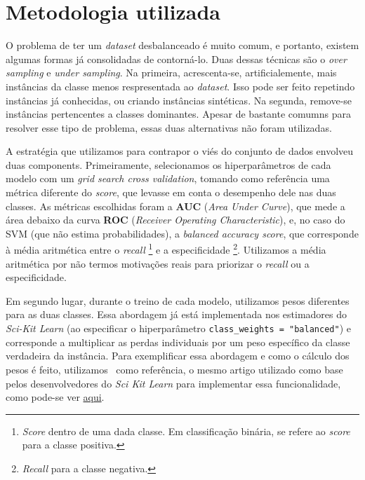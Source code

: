 \section{Metodologia utilizada}

O problema de ter um \emph{dataset} desbalanceado é muito comum, e portanto, existem algumas formas já consolidadas de contorná-lo.
Duas dessas técnicas são o \emph{over sampling} e \emph{under sampling}.
Na primeira, acrescenta-se, artificialemente, mais instâncias da classe menos respresentada ao \emph{dataset}.
Isso pode ser feito repetindo instâncias já conhecidas, ou criando instâncias sintéticas.
Na segunda, remove-se instâncias pertencentes a classes dominantes.
Apesar de bastante comumns para resolver esse tipo de problema, essas duas alternativas não foram utilizadas.

A estratégia que utilizamos para contrapor o viés do conjunto de dados envolveu duas components.
Primeiramente, selecionamos os hiperparâmetros de cada modelo com um \emph{grid search cross validation}, tomando como referência uma métrica diferente do \emph{score}, que levasse em conta o desempenho dele nas duas classes.
As métricas escolhidas foram a \textbf{AUC} (\emph{Area Under Curve}), que mede a área debaixo da curva \textbf{ROC} (\emph{Receiver Operating Characteristic}), e, no caso do SVM (que não estima probabilidades), a \emph{balanced accuracy score}, que corresponde à média aritmética entre o \emph{recall}
\footnote{\emph{Score} dentro de uma dada classe. Em classificação binária, se refere ao \emph{score} para a classe positiva.}
e a especificidade
\footnote{\emph{Recall} para a classe negativa.}.
Utilizamos a média aritmética por não termos motivações reais para priorizar o \emph{recall} ou a especificidade.

Em segundo lugar, durante o treino de cada modelo, utilizamos pesos diferentes para as duas classes.
Essa abordagem já está implementada nos estimadores do \emph{Sci-Kit Learn} (ao especificar o hiperparâmetro \verb|class_weights = "balanced"|) e corresponde a multiplicar as perdas individuais por um peso específico da classe verdadeira da instância.
Para exemplificar essa abordagem e como o cálculo dos pesos é feito, utilizamos~\cite[Páginas 144-5]{king01} como referência, o mesmo artigo utilizado como base pelos desenvolvedores do \emph{Sci Kit Learn} para implementar essa funcionalidade, como pode-se ver \href{https://scikit-learn.org/stable/modules/generated/sklearn.utils.class_weight.compute_class_weight.html}{aqui}.

